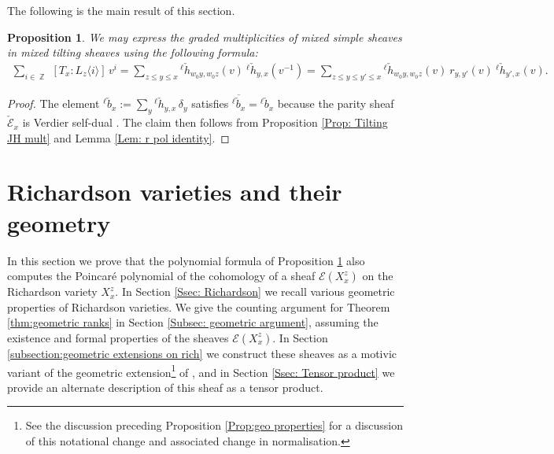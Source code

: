 \documentclass[11pt]{article}
\DeclareMathOperator{\Z}{\mathbb{Z}}
\newtheorem{prop}[thm]{Proposition}
\theoremstyle{remark}
\theoremstyle{definition}
\begin{document}
	The following is the main result of this section.
	
	\begin{prop}\label{prop:the polynomial formula}
    We may express the graded multiplicities of mixed simple sheaves in mixed tilting sheaves using the following formula:
		\begin{align*}
			\sum_{i \in \Z} ~[T_x : L_z \langle i \rangle] \, v^i
			=
			\sum_{z \leq y \leq x} {}^{\ell} \check{h}_{w_0 y, w_0 z}(v) ~{}^{\ell} \check{h}_{y,x}(v^{-1})=\sum_{z \leq y \leq y' \leq x} {}^{\ell} \check{h}_{w_0 y, w_0 z}(v) ~ r_{y,y'}(v) ~{}^{\ell} \check{h}_{y',x}(v).
		\end{align*}
	\end{prop}
	
	\begin{proof}
		The element ${}^\ell \check{b}_x :=  \sum_y {}^\ell \check{h}_{y,x} \, \delta_y$ satisfies $\overline{{}^\ell \check{b}_x} = {}^\ell \check{b}_x$ because the parity sheaf $\check{\mathscr{E}}_x$ is Verdier self-dual \cite[\S2.2]{JMW14}. 
		The claim then follows from Proposition \ref{Prop: Tilting JH mult} and Lemma \ref{Lem: r pol identity}.  
	\end{proof}

 
	



\section{Richardson varieties and their geometry}
\label{Sec: Geometry}

    In this section we prove that the polynomial formula of Proposition \ref{prop:the polynomial formula} also computes the Poincar\'{e} polynomial of the cohomology of a sheaf $\mathscr{E}(X^z_x)$ on the Richardson variety $X^z_x$.
    In Section \ref{Ssec: Richardson} we recall various geometric properties of Richardson varieties. We give the counting argument for Theorem \ref{thm:geometric ranks} in Section \ref{Subsec: geometric argument}, assuming the existence and formal properties of the sheaves $\mathscr{E}(X^z_x)$. 
    In Section \ref{subsection:geometric extensions on rich} we construct these sheaves as a motivic variant of the geometric extension\footnote{See the discussion preceding Proposition \ref{Prop:geo properties} for a discussion of this notational change and associated change in normalisation.} of \cite{HW23,McN18}, and in Section \ref{Ssec: Tensor product} we provide an alternate description of this sheaf as a tensor product.
    
\end{document}
